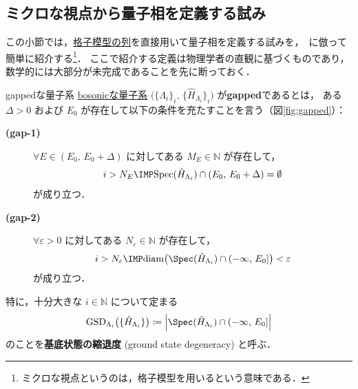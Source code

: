 \documentclass[TQFT_main]{subfiles}
\begin{document}
\subsection{ミクロな視点から量子相を定義する試み}

この小節では，\hyperref[def:bosonic-lattice-model]{格子模型の列}を直接用いて量子相を定義する試みを，~\cite{ChenGuWen2010}に倣って簡単に紹介する\footnote{ミクロな視点というのは，格子模型を用いるという意味である．}．
ここで紹介する定義は物理学者の直観に基づくものであり，数学的には大部分が未完成であることを先に断っておく．

\begin{mydefph}[label=def:gapped,breakable]{gappedな量子系}
    \hyperref[def:bosonic-lattice-model]{bosonicな量子系} $\bigl( \{\Lambda_i\}_i,\, \{\hat{H}_{\Lambda_i}\}_i \bigr)$ が\textbf{gapped}であるとは，
    ある $\Delta > 0$ および $E_0$ が存在して以下の条件を充たすことを言う（図\ref{fig:gapped}）：
    \begin{description}
        \item[\textbf{(gap-1)}] $\forall E \in (E_0,\, E_0+\Delta)$ に対してある $M_E \in \mathbb{N}$ が存在して，
        \begin{align}
            i > N_E \IMP \mathrm{Spec}(\hat{H}_{\Lambda_i}) \cap (E_0,\, E_0+\Delta) = \emptyset
        \end{align}
        が成り立つ．
        \item[\textbf{(gap-2)}] $\forall \varepsilon > 0$ に対してある $N_\varepsilon \in \mathbb{N}$ が存在して，
        \begin{align}
            i > N_\varepsilon \IMP \mathrm{diam}\bigl(\Spec (\hat{H}_{\Lambda_i}) \cap (-\infty,\, E_0] \bigr) < \varepsilon
        \end{align}
        が成り立つ．
    \end{description}
    特に，十分大きな $i \in \mathbb{N}$ について定まる
    \begin{align}
        \mathrm{GSD}_{\Lambda_i}\bigl(\{\hat{H}_{\Lambda_i}\}\bigr) \coloneqq \abs{\Spec (\hat{H}_{\Lambda_i}) \cap (-\infty,\, E_0]}
    \end{align}
    のことを\textbf{基底状態の縮退度} (ground state degeneracy) と呼ぶ．
\end{mydefph}
\end{document}
